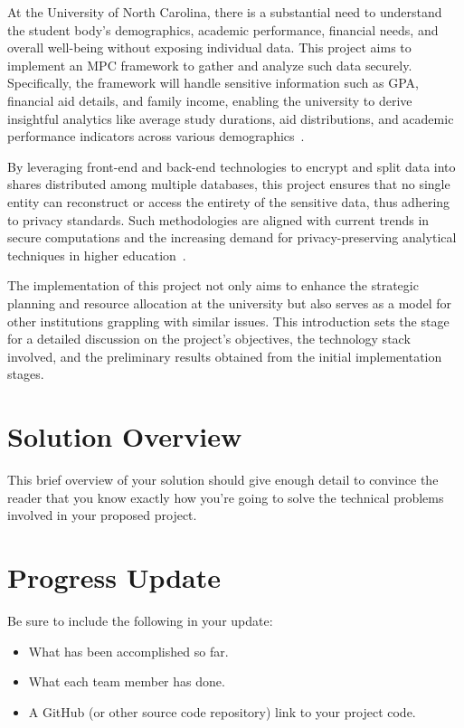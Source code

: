 \documentclass[conference]{IEEEtran}
\begin{document}
At the University of North Carolina, there is a substantial need to understand the student body's demographics, academic performance, financial needs, and overall well-being without exposing individual data. This project aims to implement an MPC framework to gather and analyze such data securely. Specifically, the framework will handle sensitive information such as GPA, financial aid details, and family income, enabling the university to derive insightful analytics like average study durations, aid distributions, and academic performance indicators across various demographics~\cite{MPC2}.

By leveraging front-end and back-end technologies to encrypt and split data into shares distributed among multiple databases, this project ensures that no single entity can reconstruct or access the entirety of the sensitive data, thus adhering to privacy standards. Such methodologies are aligned with current trends in secure computations and the increasing demand for privacy-preserving analytical techniques in higher education~\cite{PrivacyTrends}.

The implementation of this project not only aims to enhance the strategic planning and resource allocation at the university but also serves as a model for other institutions grappling with similar issues. This introduction sets the stage for a detailed discussion on the project's objectives, the technology stack involved, and the preliminary results obtained from the initial implementation stages.

\section{Solution Overview}

This brief overview of your solution should give enough detail to convince the reader that you know exactly how you're going to solve the technical problems involved in your proposed project.

\section{Progress Update}

Be sure to include the following in your update:
\begin{itemize}
\item What has been accomplished so far.

\item What each team member has done.

\item A GitHub (or other source code repository) link to your project code.
\end{itemize}
\end{document}
